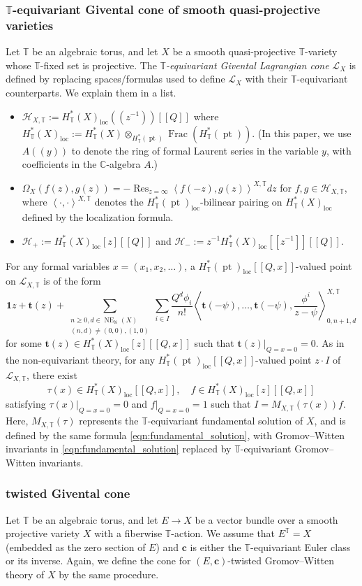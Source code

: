 \documentclass[a4paper,12pt]{amsart}
\numberwithin{equation}{section}
\theoremstyle{definition}
\newcommand{\C}{\mathbb{C}}
\newcommand{\N}{\mathbb{N}}
\newcommand{\T}{\mathbb{T}}
\newcommand{\bc}{\boldsymbol{c}}
\newcommand{\bone}{\mathbf{1}}
\newcommand{\bt}{\mathbf{t}}
\newcommand{\cH}{\mathcal{H}}
\newcommand{\cL}{\mathcal{L}}
\newcommand{\loc}{{\operatorname{loc}}}
\newcommand{\pt}{\operatorname{pt}}
\newcommand{\NE}{\operatorname{NE}_{\N}}
\newcommand{\Frac}{\operatorname{Frac}}
\newcommand{\Res}{\operatorname{Res}}
\def\corr#1{\left\langle#1 \right\rangle}
\begin{document}
\subsubsection{$\T$-equivariant Givental cone of smooth quasi-projective varieties}\label{subsubsec:equivariant_Givental_cone_qproj}
Let $\T$ be an algebraic torus, and let $X$ be a smooth quasi-projective $\T$-variety whose $\T$-fixed set is projective.
The \emph{$\T$-equivariant Givental Lagrangian cone} $\cL_X$ is defined by replacing spaces/formulas used to define $\cL_X$ with their $\T$-equivariant counterparts.
We explain them in a list.
\begin{itemize}
    \item
    $\cH_{X,\T} := H^*_\T(X)_\loc(\!(z^{-1})\!)[\![Q]\!]$ where $H^*_\T(X)_\loc:=H^*_\T(X)\otimes_{H^*_\T(\pt)}\Frac(H^*_\T(\pt))$. (In this paper, we use $A((y))$ to denote the ring of formal Laurent series in the variable $y$, with coefficients in the $\C$-algebra $A$.) 
    \item 
    $\Omega_X(f(z),g(z)) = -\Res_{z=\infty}\corr{f(-z),g(z)}^{X,\T}dz$ for $f,g\in\cH_{X,\T}$, where $\corr{\cdot,\cdot}^{X,\T}$ denotes the $H^*_\T(\pt)_\loc$-bilinear pairing on $H^*_\T(X)_\loc$ defined by the localization formula.
    \item 
    $\cH_+:=H^*_\T(X)_\loc[z][\![Q]\!]$ and $\cH_-:=z^{-1}H^*_\T(X)_\loc[\![z^{-1}]\!][\![Q]\!]$.
\end{itemize}
For any formal variables $x=(x_1,x_2,\dots)$, a $H^*_\T(\pt)_\loc[\![Q,x]\!]$-valued point on $\cL_{X,\T}$ is of the form
\[
\bone z + \bt(z) + \sum_{ \substack{n\geq0,d\in\NE(X) \\ (n,d)\neq(0,0),(1,0)} } \sum_{i\in I} \frac{Q^d\phi_i}{n!} \corr{\bt(-\psi),\dots,\bt(-\psi),\frac{\phi^i}{z-\psi}}^{X,\T}_{0,n+1,d}
\]
for some $\bt(z)\in H^*_\T(X)_\loc[z][\![Q,x]\!]$ such that $\bt(z)|_{Q=x=0}=0$.
As in the non-equivariant theory, for any $H^*_\T(\pt)_\loc[\![Q,x]\!]$-valued point $z\cdot I$ of $\cL_{X,\T}$, there exist 
\[
\tau(x)\in H^*_\T(X)_\loc[\![Q,x]\!],\quad  f\in H^*_\T(X)_\loc[z][\![Q,x]\!]
\]
satisfying $\tau(x)|_{Q=x=0}=0$ and $f|_{Q=x=0}=1$ such that $I=M_{X,\T}(\tau(x))f$.
Here, $M_{X,\T}(\tau)$ represents the $\T$-equivariant fundamental solution of $X$, and is defined by the same formula \eqref{eqn:fundamental_solution}, with Gromov--Witten invariants in \eqref{eqn:fundamental_solution} replaced by $\T$-equivariant Gromov--Witten invariants.


\subsubsection{twisted Givental cone}\label{subsubsec:twisted_Givental_cone}
Let $\T$ be an algebraic torus, and let $E\to X$ be a vector bundle over a smooth projective variety $X$ with a fiberwise $\T$-action.
We assume that $E^\T=X$ (embedded as the zero section of $E$) and $\bc$ is either the $\T$-equivariant Euler class or its inverse.
Again, we define the cone for $(E,\bc)$-twisted Gromov--Witten theory of $X$ by the same procedure.
\end{document}
